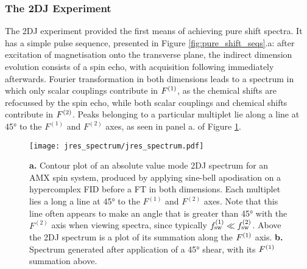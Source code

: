\subsubsection{The \acl{2DJ} Experiment}
The \ac{2DJ} experiment\cite{Aue1976, Morris2009} provided the first means of
achieving pure shift spectra.  It has a simple pulse sequence, presented in
Figure \ref{fig:pure_shift_seqs}.a: after excitation of magnetisation onto the
transverse plane, the indirect dimension evolution consists of a spin echo, with
acquisition following immediately afterwards. Fourier transformation in both
dimensions leads to a spectrum in which only scalar couplings contribute in
$F^{(1)}$, as the chemical shifts are refocussed by the spin echo, while both
scalar couplings and chemical shifts contribute in $F^{(2)}$.
Peaks belonging to a particular multiplet lie along a line at \ang{45} to the
$F^{(1)}$ and $F^{(2)}$ axes, as seen in panel a. of Figure
\ref{fig:jres_spectrum}.
\begin{figure}%
    \centering%
    \texttt{[image: jres\_spectrum/jres\_spectrum.pdf]}%
    \caption[
        Example of a simple \acs{2DJ} spectrum derived from an AMX spin system.
    ]
    {%
        \textbf{a.} Contour plot of an absolute value mode \ac{2DJ} spectrum for an
        AMX spin system, produced by applying sine-bell apodisation on a hypercomplex
        \ac{FID} before a \ac{FT} in both dimensions. Each multiplet lies a
        long a line at \ang{45} to the $F^{(1)}$ and $F^{(2)}$ axes. Note that
        this line often appears to make an angle that is greater than \ang{45}
        with the $F^{(2)}$ axis when viewing spectra, since typically $f_{\mathrm{sw}}^{(1)}
        \ll f_{\mathrm{sw}}^{(2)}$. Above the \ac{2DJ} spectrum is a plot of its summation
        along the $F^{(1)}$ axis.
        \textbf{b.} Spectrum generated after application of a \ang{45} shear,
        with its $F^{(1)}$ summation above.
   }%
    \label{fig:jres_spectrum}%
\end{figure}%

